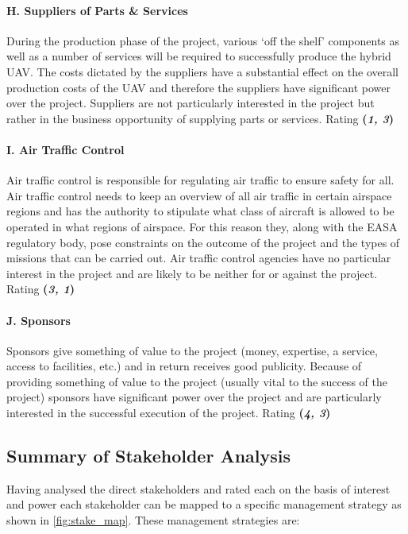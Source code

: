 \paragraph{H. Suppliers of Parts \& Services}
During the production phase of the project, various `off the shelf' components as well as a number of services will be required to successfully produce the hybrid UAV. The costs dictated by the suppliers have a substantial effect on the overall production costs of the UAV and therefore the suppliers have significant power over the project. Suppliers are not particularly interested in the project but rather in the business opportunity of supplying parts or services. Rating \textbf{(\textit{1, 3})} 

\paragraph{I. Air Traffic Control}
Air traffic control is responsible for regulating air traffic to ensure safety for all. Air traffic control needs to keep an overview of all air traffic in certain airspace regions and has the authority to stipulate what class of aircraft is allowed to be operated in what regions of airspace. For this reason they, along with the EASA regulatory body, pose constraints on the outcome of the project and the types of missions that can be carried out. Air traffic control agencies have no particular interest in the project and are likely to be neither for or against the project. Rating \textbf{(\textit{3, 1})}

\paragraph{J. Sponsors}
Sponsors give something of value to the project (money, expertise, a service, access to facilities, etc.) and in return receives good publicity. Because of providing something of value to the project (usually vital to the success of the project) sponsors have significant power over the project and are particularly interested in the successful execution of the project. Rating \textbf{(\textit{4, 3})} 

\subsection{Summary of Stakeholder Analysis}
Having analysed the direct stakeholders and rated each on the basis of interest and power each stakeholder can be mapped to a specific management strategy as shown in \autoref{fig:stake_map}. These management strategies are:

